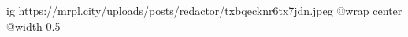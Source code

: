  
 
 
 
 

\ifcmt
  ig https://mrpl.city/uploads/posts/redactor/txbqecknr6tx7jdn.jpeg
  @wrap center
  @width 0.5
\fi
